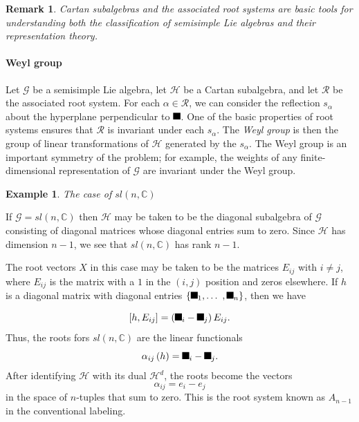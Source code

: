 \documentclass[aps,preprint]{revtex4}%
\providecommand{\U}[1]{\protect\rule{.1in}{.1in}}
\newtheorem{example}[theorem]{Example}
\newtheorem{remark}[theorem]{Remark}
\begin{document}
\begin{remark}
Cartan subalgebras and the associated root systems are basic tools for
understanding both the classification of semisimple Lie algebras and their
representation theory.
\end{remark}

\paragraph{Weyl group}

Let $\mathcal{G}$ be a semisimple Lie algebra, let $\mathcal{H}$ be a Cartan
subalgebra, and let $\mathcal{R}$ be the associated root system. For each
$\alpha\in\mathcal{R}$, we can consider the reflection $s_{\alpha}$ about the
hyperplane perpendicular to $\U{3b1} $. One of the basic properties of root
systems ensures that $\mathcal{R}$ is invariant under each $s_{\alpha}$. The
\emph{Weyl group} is then the group of linear transformations of $\mathcal{H}$
generated by the $s_{\alpha}$. The Weyl group is an important symmetry of the
problem; for example, the weights of any finite-dimensional representation of
$\mathcal{G}$ are invariant under the Weyl group.

\begin{example}
The case of $sl\left(  n,\mathbb{C}\right)  $
\end{example}

If $\mathcal{G}=sl\left(  n,\mathbb{C}\right)  $ then $\mathcal{H}$ may be
taken to be the diagonal subalgebra of $\mathcal{G}$ consisting of diagonal
matrices whose diagonal entries sum to zero. Since $\mathcal{H}$ has dimension
$n-1$, we see that $sl\left(  n,\mathbb{C}\right)  $ has rank $n-1$.

The root vectors $X$ in this case may be taken to be the matrices $E_{ij}$
with $i\neq j$, where $E_{ij}$ is the matrix with a $1$ in the $(i,j)$
position and zeros elsewhere. If $h$ is a diagonal matrix with diagonal
entries $\left\{  \U{3bb} _{1},\ldots\ ,\U{3bb} _{n}\right\}  $, then we have%

\begin{equation}
\left[  h,E_{ij}\right]  =\left(  \U{3bb} _{i}-\U{3bb} _{j}\right)  E_{ij}.
\end{equation}
Thus, the roots fors $sl\left(  n,\mathbb{C}\right)  $ are the linear
functionals
\begin{equation}
\alpha_{ij}\left(  h\right)  =\U{3bb} _{i}-\U{3bb} _{j}.
\end{equation}
After identifying $\mathcal{H}$ with its dual $\mathcal{H}^{d}$, the roots
become the vectors%
\begin{equation}
\alpha_{ij}=e_{i}-e_{j}%
\end{equation}
in the space of $n$-tuples that sum to zero. This is the root system known as
$A_{n-1}$ in the conventional labeling.\qquad
\end{document}
